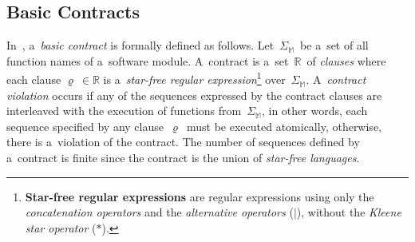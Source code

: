 \subsection{Basic Contracts}
\label{sec:basicContracts}

In~\cite{contracts2017, contracts2015}, a~\emph{basic contract} is
formally defined as follows. Let~$ \Sigma_\mathbb{M} $~be a~set of all
function names of a~software module. A~contract is
a~set~$ \mathbb{R} $~of \emph{clauses} where each clause
$ \varrho\ \in \mathbb{R} $ is a~\emph{star-free regular
expression}\footnote{\textbf{Star-free regular expressions} are
regular expressions using only the \emph{concatenation operators}
and the \emph{alternative operators} ($ | $), without the
\emph{Kleene star operator} ($ * $).} over~$ \Sigma_\mathbb{M} $.
A~\emph{contract violation} occurs if any of the sequences expressed by
the contract clauses are interleaved with the execution of functions
from~$ \Sigma_\mathbb{M} $, in other words, each sequence specified by
any clause~$ \varrho $~must be executed atomically, otherwise, there
is a~violation of the contract. The number of sequences defined by
a~contract is finite since the contract is the union of
\emph{star-free languages}.

